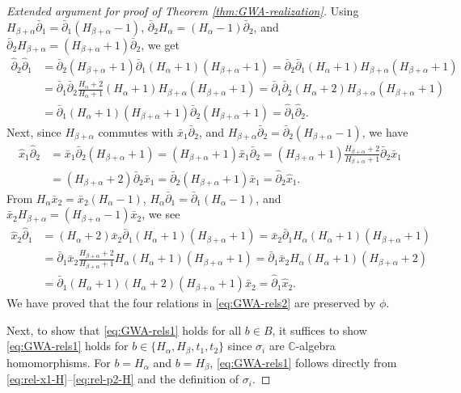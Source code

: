\documentclass[10pt,a4paper]{amsart}
\numberwithin{equation}{section}
\begin{document}
\begin{proof}[Extended argument for proof of Theorem \ref{thm:GWA-realization}]
	Using $H_{\beta+\alpha}\bar{\partial}_1=\bar{\partial}_1(H_{\beta+\alpha}-1)$, $\bar{\partial}_2 H_\alpha=(H_\alpha-1)\bar{\partial}_2$, and $\bar{\partial}_2 H_{\beta+\alpha} = (H_{\beta+\alpha}+1)\bar{\partial}_2$, we get
	\begin{align*}
		\hat{\partial}_2\hat{\partial}_1 &= \bar{\partial}_2(H_{\beta+\alpha}+1)\bar{\partial}_1(H_\alpha+1)(H_{\beta+\alpha}+1)=\bar{\partial}_2\bar{\partial}_1(H_\alpha+1)H_{\beta+\alpha}(H_{\beta+\alpha}+1)\\
		&=\bar{\partial}_1\bar{\partial}_2\frac{H_\alpha+2}{H_\alpha+1}(H_\alpha+1)H_{\beta+\alpha}(H_{\beta+\alpha}+1)=
		\bar{\partial}_1\bar{\partial}_2(H_\alpha+2)H_{\beta+\alpha}(H_{\beta+\alpha}+1)\\
		&=\bar{\partial}_1 (H_\alpha+1)(H_{\beta+\alpha}+1)\bar{\partial}_2(H_{\beta+\alpha}+1)=\hat{\partial}_1\hat{\partial}_2.
	\end{align*}
	Next, since $H_{\beta+\alpha}$ commutes with $\bar{x}_1\bar{\partial}_2$, and $H_{\beta+\alpha}\bar{\partial}_2=\bar{\partial}_2(H_{\beta+\alpha}-1)$, we have
	\begin{align*}
		\hat{x}_1\hat{\partial}_2 &= \bar{x}_1\bar{\partial}_2(H_{\beta+\alpha}+1)=
		(H_{\beta+\alpha}+1)\bar{x}_1\bar{\partial}_2=
		(H_{\beta+\alpha}+1)\frac{H_{\beta+\alpha}+2}{H_{\beta+\alpha}+1}\bar{\partial}_2\bar{x}_1\\
		&=(H_{\beta+\alpha}+2)\bar{\partial}_2\bar{x}_1=\bar{\partial}_2(H_{\beta+\alpha}+1)\bar{x}_1=\hat{\partial}_2\hat{x}_1.
	\end{align*}
	From $H_\alpha\bar{x}_2=\bar{x}_2(H_\alpha-1)$, $H_\alpha\bar{\partial}_1=\bar{\partial}_1(H_\alpha-1)$, and $\bar{x}_2 H_{\beta+\alpha} = (H_{\beta+\alpha}-1)\bar{x}_2$, we see
	\begin{align*}
		\hat{x}_2\hat{\partial}_1&=(H_\alpha+2)\bar{x}_2\bar{\partial}_1(H_\alpha+1)(H_{\beta+\alpha}+1)=\bar{x}_2\bar{\partial}_1 H_\alpha (H_\alpha+1)(H_{\beta+\alpha}+1)\\
		&=\bar{\partial}_1\bar{x}_2\frac{H_{\beta+\alpha}+2}{H_{\beta+\alpha}+1}H_\alpha (H_\alpha+1)(H_{\beta+\alpha}+1)=
		\bar{\partial}_1\bar{x}_2 H_\alpha(H_\alpha+1)(H_{\beta+\alpha}+2)\\
		&=\bar{\partial}_1(H_\alpha+1)(H_\alpha+2)(H_{\beta+\alpha}+1)\bar{x}_2=\hat{\partial}_1\hat{x}_2.
	\end{align*}
	We have proved that the four relations in \eqref{eq:GWA-rels2} are preserved by $\phi$.
	
	Next, to show that \eqref{eq:GWA-rels1} holds for all $b\in B$, it suffices to show \eqref{eq:GWA-rels1} holds for $b\in\{H_\alpha, H_\beta, t_1, t_2\}$ since $\sigma_i$ are $\mathbb{C}$-algebra homomorphisms.
	For $b=H_\alpha$ and $b=H_\beta$, \eqref{eq:GWA-rels1} follows directly from \eqref{eq:rel-x1-H}--\eqref{eq:rel-p2-H} and the definition of $\sigma_i$.
	

\end{proof}
\end{document}
